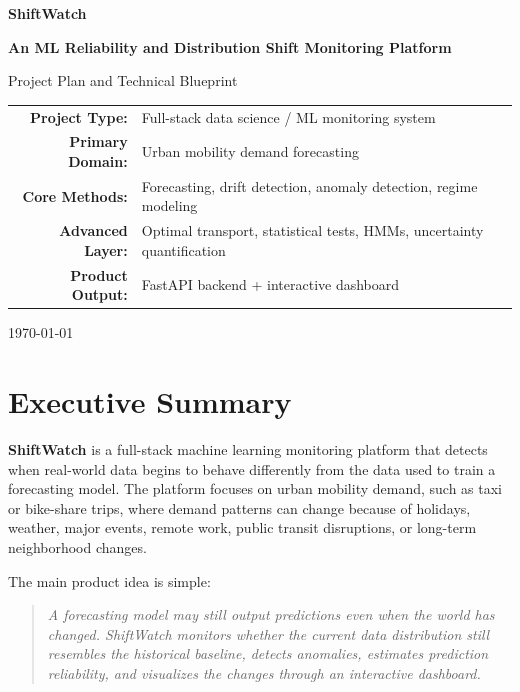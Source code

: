 \documentclass[11pt]{article}
\begin{document}
\begin{titlepage}
    \centering
    \vspace*{1.5cm}
    {\Huge \textbf{ShiftWatch} \par}
    \vspace{0.5cm}
    {\Large \textbf{An ML Reliability and Distribution Shift Monitoring Platform}\par}
    \vspace{0.5cm}
    {\large Project Plan and Technical Blueprint\par}
    \vfill
    \begin{tabular}{rl}
        \textbf{Project Type:} & Full-stack data science / ML monitoring system \\
        \textbf{Primary Domain:} & Urban mobility demand forecasting \\
        \textbf{Core Methods:} & Forecasting, drift detection, anomaly detection, regime modeling \\
        \textbf{Advanced Layer:} & Optimal transport, statistical tests, HMMs, uncertainty quantification \\
        \textbf{Product Output:} & FastAPI backend + interactive dashboard \\
    \end{tabular}
    \vfill
    {\large \today\par}
\end{titlepage}

\tableofcontents
\newpage

\section{Executive Summary}

\textbf{ShiftWatch} is a full-stack machine learning monitoring platform that detects when real-world data begins to behave differently from the data used to train a forecasting model. The platform focuses on urban mobility demand, such as taxi or bike-share trips, where demand patterns can change because of holidays, weather, major events, remote work, public transit disruptions, or long-term neighborhood changes.

The main product idea is simple:

\begin{quote}
    \textit{A forecasting model may still output predictions even when the world has changed. ShiftWatch monitors whether the current data distribution still resembles the historical baseline, detects anomalies, estimates prediction reliability, and visualizes the changes through an interactive dashboard.}
\end{quote}
\end{document}
